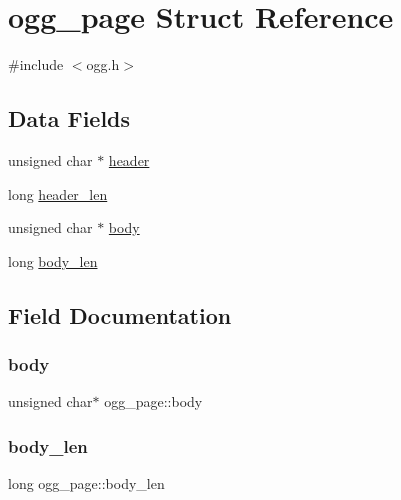 \hypertarget{structogg__page}{}\section{ogg\+\_\+page Struct Reference}
\label{structogg__page}


{\ttfamily \#include $<$ogg.\+h$>$}

\subsection*{Data Fields}
\begin{DoxyCompactItemize}
\item 
unsigned char $\ast$ \hyperlink{structogg__page_a9f251dc1a96fbfd84ff2585fbbc03c16}{header}
\item 
long \hyperlink{structogg__page_aeaa6edc2ff9f2c5cc8f0ecf001936b7b}{header\+\_\+len}
\item 
unsigned char $\ast$ \hyperlink{structogg__page_af2fdee76f20ac267c6233f1d5f8afd30}{body}
\item 
long \hyperlink{structogg__page_ac6e649f0001899b512935448a903abac}{body\+\_\+len}
\end{DoxyCompactItemize}


\subsection{Field Documentation}
\mbox{\label{structogg__page_af2fdee76f20ac267c6233f1d5f8afd30}} 
\subsubsection{\texorpdfstring{body}{body}}
{\footnotesize\ttfamily unsigned char$\ast$ ogg\+\_\+page\+::body}

\mbox{\label{structogg__page_ac6e649f0001899b512935448a903abac}} 
\subsubsection{\texorpdfstring{body\+\_\+len}{body\_len}}
{\footnotesize\ttfamily long ogg\+\_\+page\+::body\+\_\+len}

